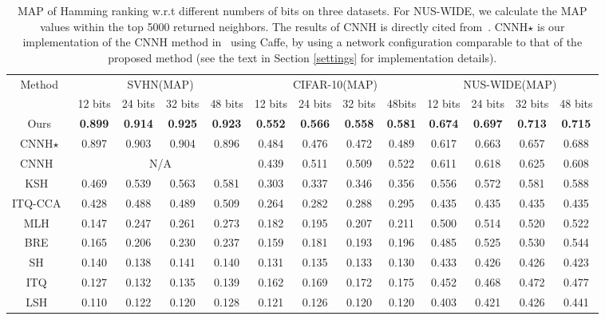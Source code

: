 \documentclass[10pt,twocolumn,letterpaper]{article}
\begin{document}
\begin{table*}[t]
\small
    \centering \caption{MAP of Hamming ranking w.r.t different numbers of bits on three datasets. For NUS-WIDE, we calculate the MAP values within the top 5000 returned neighbors. The results of CNNH is directly cited from~\cite{CNNH}. CNNH$\star$ is our implementation of the CNNH method in~\cite{CNNH} using Caffe, by using a network configuration comparable to that of the proposed method (see the text in Section \ref{settings} for implementation details).}
    \begin{tabular}{|c|c c c c|c c c c|c c c c|}
        \hline
\multirow{2}{*}{ Method } & \multicolumn{4}{|c}{SVHN(MAP)} &\multicolumn{4}{|c}{CIFAR-10(MAP)} & \multicolumn{4}{|c|}{NUS-WIDE(MAP)}\\
& 12 bits & 24 bits & 32 bits & 48 bits & 12 bits & 24 bits & 32 bits& 48bits & 12 bits & 24 bits &32 bits & 48 bits \\
        \hline
        Ours & {\bf 0.899 }&{\bf 0.914} & {\bf 0.925} & {\bf 0.923} & {\bf 0.552} & {\bf 0.566} & {\bf 0.558} & {\bf 0.581}  & {\bf 0.674} & {\bf 0.697} &  {\bf 0.713} &  {\bf 0.715} \\
         \hline
       CNNH$\star$ &  0.897 & 0.903 & 0.904 & 0.896 & 0.484 & 0.476  & 0.472 & 0.489 & 0.617 & 0.663 & 0.657 & 0.688 \\
         \hline
         CNNH~\cite{CNNH} & \multicolumn{4}{|c|}{N/A}& 0.439 & 0.511 & 0.509 & 0.522 & 0.611 & 0.618 & 0.625 & 0.608 \\
         \hline
         KSH~\cite{KSH} & 0.469 & 0.539 & 0.563 & 0.581 & 0.303 & 0.337 & 0.346 & 0.356 & 0.556 & 0.572 & 0.581 & 0.588  \\
         \hline
          ITQ-CCA~\cite{ITQ} & 0.428 & 0.488 & 0.489 & 0.509 & 0.264 & 0.282 & 0.288 & 0.295  & 0.435 & 0.435 & 0.435 & 0.435 \\
         \hline
          MLH~\cite{MLH} & 0.147 & 0.247& 0.261 & 0.273 & 0.182 & 0.195 & 0.207 & 0.211 & 0.500 & 0.514 & 0.520 & 0.522  \\
         \hline
          BRE~\cite{BRE}  & 0.165 & 0.206 &0.230 & 0.237 & 0.159 & 0.181 & 0.193 & 0.196   & 0.485 & 0.525 & 0.530 & 0.544\\
         \hline
         SH~\cite{SH} & 0.140 & 0.138 & 0.141 &  0.140 & 0.131 & 0.135 & 0.133 & 0.130 & 0.433 & 0.426 & 0.426 & 0.423  \\
         \hline
         ITQ~\cite{ITQ} & 0.127 & 0.132 & 0.135 & 0.139 &  0.162 & 0.169 & 0.172 & 0.175 & 0.452 & 0.468 & 0.472 & 0.477 \\
         \hline
          LSH~\cite{LSH} & 0.110 & 0.122 & 0.120 & 0.128 & 0.121 & 0.126 & 0.120 & 0.120 & 0.403 & 0.421 & 0.426 & 0.441 \\
         \hline
        \end{tabular}
    \label{map_hr}
\end{table*}
\end{document}
